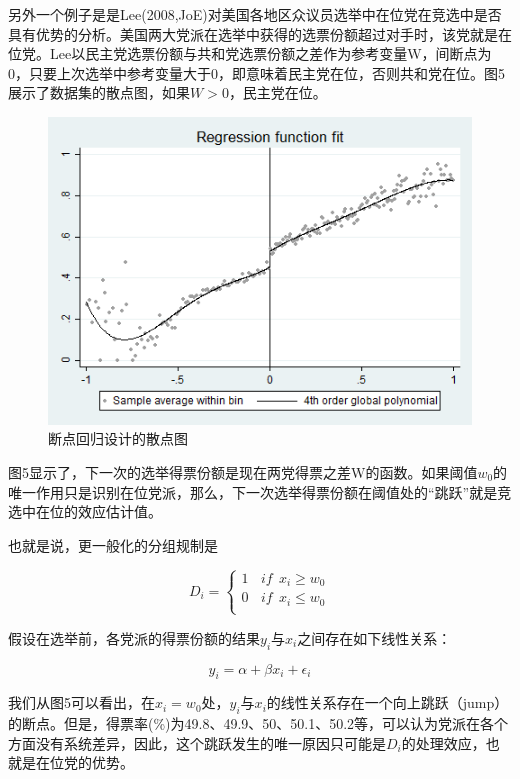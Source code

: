 \documentclass[cn,12pt,math=newtx,citestyle=gb7714-2015,bibstyle=gb7714-2015]{elegantbook}
\begin{document}
	另外一个例子是是Lee(2008,JoE)对美国各地区众议员选举中在位党在竞选中是否具有优势的分析。美国两大党派在选举中获得的选票份额超过对手时，该党就是在位党。Lee以民主党选票份额与共和党选票份额之差作为参考变量W，间断点为0，只要上次选举中参考变量大于0，即意味着民主党在位，否则共和党在位。图5展示了数据集的散点图，如果$W>0$，民主党在位。
	\begin{figure}[htbp]
		\centering
		\includegraphics[width=1\textwidth]{rdgraph.png}
		\caption{断点回归设计的散点图}\label{fig:digit}
	\end{figure}
	
	图5显示了，下一次的选举得票份额是现在两党得票之差W的函数。如果阈值$w_0$的唯一作用只是识别在位党派，那么，下一次选举得票份额在阈值处的“跳跃”就是竞选中在位的效应估计值。
	
	也就是说，更一般化的分组规制是
	
	\begin{equation}
		D_i= \left\{
		\begin{aligned}
			1~~~~if ~~x_i\geq{w_0}  \\
			0~~~~if ~~x_i\le{w_0} \\
		\end{aligned}
		\right.
	\end{equation}
	
	假设在选举前，各党派的得票份额的结果$y_i$与$x_i$之间存在如下线性关系：
	
	\begin{equation}
		y_i=\alpha+\beta{x_i}+\epsilon_i
	\end{equation}
	
	我们从图5可以看出，在$x_i=w_0$处，$y_i$与$x_i$的线性关系存在一个向上跳跃（jump）的断点。但是，得票率(\%)为49.8、49.9、50、50.1、50.2等，可以认为党派在各个方面没有系统差异，因此，这个跳跃发生的唯一原因只可能是$D_i$的处理效应，也就是在位党的优势。
	
\end{document}
